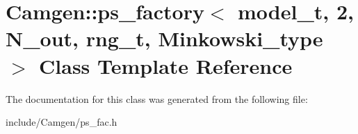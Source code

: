 \hypertarget{a00440}{\section{Camgen\-:\-:ps\-\_\-factory$<$ model\-\_\-t, 2, N\-\_\-out, rng\-\_\-t, Minkowski\-\_\-type $>$ Class Template Reference}
\label{a00440}
}


The documentation for this class was generated from the following file\-:\begin{DoxyCompactItemize}
\item 
include/\-Camgen/ps\-\_\-fac.\-h\end{DoxyCompactItemize}
